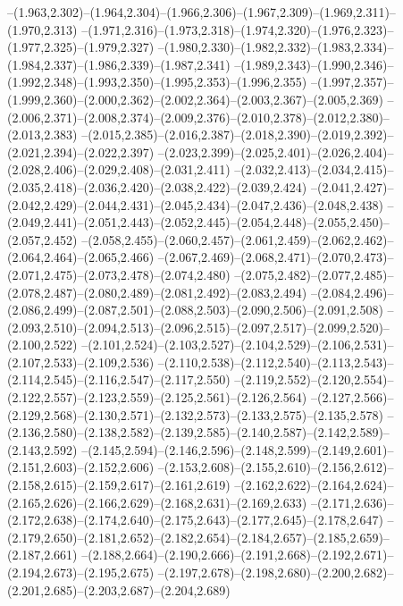   --(1.963,2.302)--(1.964,2.304)--(1.966,2.306)--(1.967,2.309)--(1.969,2.311)--(1.970,2.313)%
  --(1.971,2.316)--(1.973,2.318)--(1.974,2.320)--(1.976,2.323)--(1.977,2.325)--(1.979,2.327)%
  --(1.980,2.330)--(1.982,2.332)--(1.983,2.334)--(1.984,2.337)--(1.986,2.339)--(1.987,2.341)%
  --(1.989,2.343)--(1.990,2.346)--(1.992,2.348)--(1.993,2.350)--(1.995,2.353)--(1.996,2.355)%
  --(1.997,2.357)--(1.999,2.360)--(2.000,2.362)--(2.002,2.364)--(2.003,2.367)--(2.005,2.369)%
  --(2.006,2.371)--(2.008,2.374)--(2.009,2.376)--(2.010,2.378)--(2.012,2.380)--(2.013,2.383)%
  --(2.015,2.385)--(2.016,2.387)--(2.018,2.390)--(2.019,2.392)--(2.021,2.394)--(2.022,2.397)%
  --(2.023,2.399)--(2.025,2.401)--(2.026,2.404)--(2.028,2.406)--(2.029,2.408)--(2.031,2.411)%
  --(2.032,2.413)--(2.034,2.415)--(2.035,2.418)--(2.036,2.420)--(2.038,2.422)--(2.039,2.424)%
  --(2.041,2.427)--(2.042,2.429)--(2.044,2.431)--(2.045,2.434)--(2.047,2.436)--(2.048,2.438)%
  --(2.049,2.441)--(2.051,2.443)--(2.052,2.445)--(2.054,2.448)--(2.055,2.450)--(2.057,2.452)%
  --(2.058,2.455)--(2.060,2.457)--(2.061,2.459)--(2.062,2.462)--(2.064,2.464)--(2.065,2.466)%
  --(2.067,2.469)--(2.068,2.471)--(2.070,2.473)--(2.071,2.475)--(2.073,2.478)--(2.074,2.480)%
  --(2.075,2.482)--(2.077,2.485)--(2.078,2.487)--(2.080,2.489)--(2.081,2.492)--(2.083,2.494)%
  --(2.084,2.496)--(2.086,2.499)--(2.087,2.501)--(2.088,2.503)--(2.090,2.506)--(2.091,2.508)%
  --(2.093,2.510)--(2.094,2.513)--(2.096,2.515)--(2.097,2.517)--(2.099,2.520)--(2.100,2.522)%
  --(2.101,2.524)--(2.103,2.527)--(2.104,2.529)--(2.106,2.531)--(2.107,2.533)--(2.109,2.536)%
  --(2.110,2.538)--(2.112,2.540)--(2.113,2.543)--(2.114,2.545)--(2.116,2.547)--(2.117,2.550)%
  --(2.119,2.552)--(2.120,2.554)--(2.122,2.557)--(2.123,2.559)--(2.125,2.561)--(2.126,2.564)%
  --(2.127,2.566)--(2.129,2.568)--(2.130,2.571)--(2.132,2.573)--(2.133,2.575)--(2.135,2.578)%
  --(2.136,2.580)--(2.138,2.582)--(2.139,2.585)--(2.140,2.587)--(2.142,2.589)--(2.143,2.592)%
  --(2.145,2.594)--(2.146,2.596)--(2.148,2.599)--(2.149,2.601)--(2.151,2.603)--(2.152,2.606)%
  --(2.153,2.608)--(2.155,2.610)--(2.156,2.612)--(2.158,2.615)--(2.159,2.617)--(2.161,2.619)%
  --(2.162,2.622)--(2.164,2.624)--(2.165,2.626)--(2.166,2.629)--(2.168,2.631)--(2.169,2.633)%
  --(2.171,2.636)--(2.172,2.638)--(2.174,2.640)--(2.175,2.643)--(2.177,2.645)--(2.178,2.647)%
  --(2.179,2.650)--(2.181,2.652)--(2.182,2.654)--(2.184,2.657)--(2.185,2.659)--(2.187,2.661)%
  --(2.188,2.664)--(2.190,2.666)--(2.191,2.668)--(2.192,2.671)--(2.194,2.673)--(2.195,2.675)%
  --(2.197,2.678)--(2.198,2.680)--(2.200,2.682)--(2.201,2.685)--(2.203,2.687)--(2.204,2.689)%
